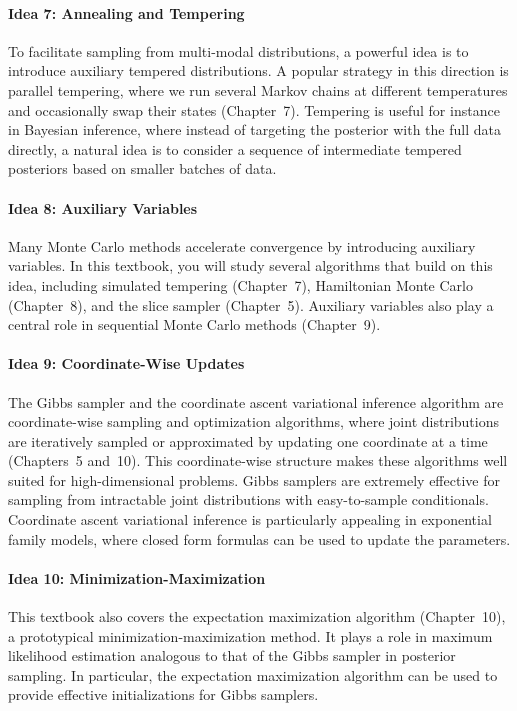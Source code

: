 \paragraph{Idea 7: Annealing and Tempering}
To facilitate sampling from multi-modal distributions, a powerful idea is to introduce auxiliary
tempered distributions. A popular strategy in this direction is parallel tempering, where we run
several Markov chains at different temperatures and occasionally swap their states (Chapter~7).
Tempering is useful for instance in Bayesian inference, where instead of targeting the posterior
with the full data directly, a natural idea is to consider a sequence of intermediate tempered
posteriors based on smaller batches of data.

\paragraph{Idea 8: Auxiliary Variables}
Many Monte Carlo methods accelerate convergence by introducing auxiliary variables. In this
textbook, you will study several algorithms that build on this idea, including simulated tempering
(Chapter~7), Hamiltonian Monte Carlo (Chapter~8), and the slice sampler (Chapter~5). Auxiliary
variables also play a central role in sequential Monte Carlo methods (Chapter~9).

\paragraph{Idea 9: Coordinate-Wise Updates}
The Gibbs sampler and the coordinate ascent variational inference algorithm are coordinate-wise
sampling and optimization algorithms, where joint distributions are iteratively sampled or
approximated by updating one coordinate at a time (Chapters~5 and~10). This coordinate-wise
structure makes these algorithms well suited for high-dimensional problems. Gibbs samplers are
extremely effective for sampling from intractable joint distributions with easy-to-sample
conditionals. Coordinate ascent variational inference is particularly appealing in exponential
family models, where closed form formulas can be used to update the parameters.

\paragraph{Idea 10: Minimization-Maximization}
This textbook also covers the expectation maximization algorithm (Chapter~10), a prototypical
minimization-maximization method. It plays a role in maximum likelihood estimation analogous to
that of the Gibbs sampler in posterior sampling. In particular, the expectation maximization
algorithm can be used to provide effective initializations for Gibbs samplers.
